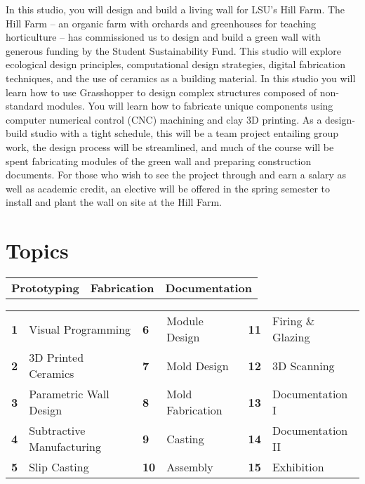 \documentclass[11pt,article,oneside]{memoir}
\begin{document}
In this studio, you will design and build
a living wall for LSU's Hill Farm.
The Hill Farm --
an organic farm with orchards and greenhouses
for teaching horticulture --
has commissioned us to design and build a green wall
with generous funding by the Student Sustainability Fund.
This studio will explore
ecological design principles,
computational design strategies,
digital fabrication techniques, and
the use of ceramics as a building material.
In this studio you will learn how to use Grasshopper
to design complex structures
composed of non-standard modules.
You will learn how to fabricate unique components
using computer numerical control (CNC) machining
and clay 3D printing.
As a design-build studio with a tight schedule,
this will be a team project entailing group work,
the design process will be streamlined,
and much of the course will be spent
fabricating modules of the green wall
and preparing construction documents.
For those who wish to see the project through
and earn a salary as well as academic credit,
an elective will be offered in the spring semester
to install and plant the wall on site at the Hill Farm.
\\

\section{Topics}
%
\begin{table}[H]
\begin{tabular}{l @{\hskip 3.5cm} l @{\hskip 2.2cm} l}
\textbf{Prototyping} & \textbf{Fabrication} & \textbf{Documentation}\\
\end{tabular}
\end{table}
%
\vspace*{-1em}
%
\begin{table}[H]
\begin{tabular}{l l l l l l}
\small
\textbf{1} & Visual Programming  & \textbf{6} & Module Design & \textbf{11} & Firing \& Glazing\\
\textbf{2} & 3D Printed Ceramics & \textbf{7} & Mold Design & \textbf{12} & 3D Scanning\\
\textbf{3} & Parametric Wall Design & \textbf{8} & Mold Fabrication & \textbf{13} & Documentation I\\
\textbf{4} & Subtractive Manufacturing & \textbf{9} & Casting & \textbf{14} & Documentation II\\
\textbf{5} & Slip Casting & \textbf{10} & Assembly & \textbf{15} & Exhibition\\
\end{tabular}
\end{table}
\end{document}
